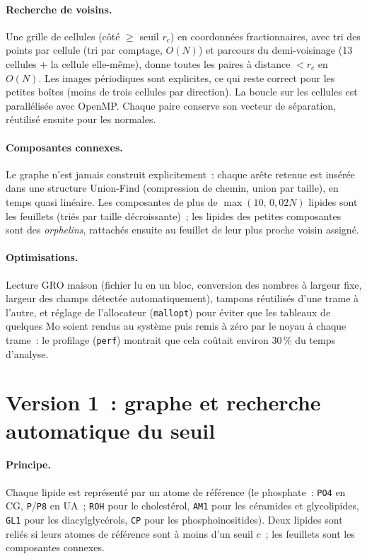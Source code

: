 \documentclass[11pt,a4paper]{article}
\begin{document}
\paragraph{Recherche de voisins.} Une grille de cellules (côté $\geq$ seuil $r_c$) en coordonnées fractionnaires,
avec tri des points par cellule (tri par comptage, $O(N)$) et parcours du demi-voisinage (13 cellules + la cellule
elle-même), donne toutes les paires à distance $<r_c$ en $O(N)$. Les images périodiques sont explicites, ce qui reste
correct pour les petites boîtes (moins de trois cellules par direction). La boucle sur les cellules est parallélisée
avec OpenMP. Chaque paire conserve son vecteur de séparation, réutilisé ensuite pour les normales.

\paragraph{Composantes connexes.} Le graphe n'est jamais construit explicitement~: chaque arête retenue est
insérée dans une structure Union-Find (compression de chemin, union par taille), en temps quasi linéaire. Les
composantes de plus de $\max(10,\,0{,}02N)$ lipides sont les feuillets (triés par taille décroissante)~; les
lipides des petites composantes sont des \emph{orphelins}, rattachés ensuite au feuillet de leur plus proche voisin
assigné.

\paragraph{Optimisations.} Lecture GRO maison (fichier lu en un bloc, conversion des nombres à largeur fixe, largeur
des champs détectée automatiquement), tampons réutilisés d'une trame à l'autre, et réglage de l'allocateur
(\texttt{mallopt}) pour éviter que les tableaux de quelques Mo soient rendus au système puis remis à zéro par le
noyau à chaque trame~: le profilage (\texttt{perf}) montrait que cela coûtait environ 30\,\% du temps d'analyse.

\section{Version 1~: graphe et recherche automatique du seuil}\label{sec:v1}
\paragraph{Principe.} Chaque lipide est représenté par un atome de référence (le phosphate~: \texttt{PO4} en CG,
\texttt{P}/\texttt{P8} en UA~; \texttt{ROH} pour le cholestérol, \texttt{AM1} pour les céramides et glycolipides,
\texttt{GL1} pour les diacylglycérols, \texttt{CP} pour les phosphoinositides). Deux lipides sont reliés si leurs
atomes de référence sont à moins d'un seuil $c$~; les feuillets sont les composantes connexes.
\end{document}
